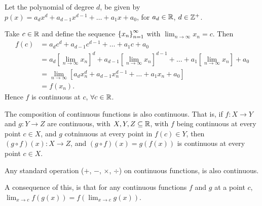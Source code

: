 \documentclass[12pt]{article}
\theoremstyle{definition}
\renewenvironment{proof}[1][\proofname]{\vspace{-10pt}\begin{replacementproof}}{\end{replacementproof}}
\newcommand{\xn}{\set{x_{n}}_{n = 1}^{\infty}}
\newcommand{\nlim}{\lim_{n\rightarrow\infty}}
\newcommand{\xlim}{\lim_{x \rightarrow c}}
\begin{document}
        \begin{proof}
            Let the polynomial of degree $d$, be given by $p(x) = a_{d}x^{d} + a_{d - 1}x^{d - 1} + \dots + a_{1}x + a_{0}$, for $a_{d} \in \R$, $d \in \mathbb{Z}^{+}$.

            Take $c \in \R$ and define the sequence $\xn$ with $\nlim x_{n} = c$.
            Then
            \begin{align*}
                f(c) &= a_{d}c^{d} + a_{d - 1}c^{d - 1} + \dots + a_{1}c + a_{0} \\
                     &= a_{d}\left[ \nlim x_{n} \right]^{d} + a_{d - 1}\left[ \nlim x_{n} \right]^{d - 1} + \dots + a_{1}\left[ \nlim x_{n} \right] + a_{0} \\
                     &= \nlim\left[ a_{d}x_{n}^{d} + a_{d - 1}x_{n}^{d - 1} + \dots + a_{1}x_{n} + a_{0}\right] \\
                     &= f(x_{n}).
            \end{align*}
            Hence $f$ is continuous at $c$, $\forall c \in \R$. 
        \end{proof}
        \newpage
        \begin{prop}
            The composition of continuous functions is also continuous. That is, if $f: X \rightarrow Y$ and $g: Y \rightarrow Z$ are continuous, with $X, Y, Z \subseteq \R$, with $f$ being continuous at every point $c \in X$, and $g$ cotninuous at every point in $f(c) \in Y$, then $(g \circ f)(x): X \rightarrow Z$, and $(g \circ f)(x) = g(f(x))$ is continuous at every point $c \in X$.
        \end{prop}
        \begin{corollary}
            Any standard operation ($+$, $-$, $\times$, $\div$) on continuous functions, is also continuous.
        \end{corollary}
        \begin{remark}
            A consequence of this, is that for any continuous functions $f$ and $g$ at a point $c$, $\xlim f(g(x)) = f(\xlim g(x))$.
        \end{remark}
\end{document}
